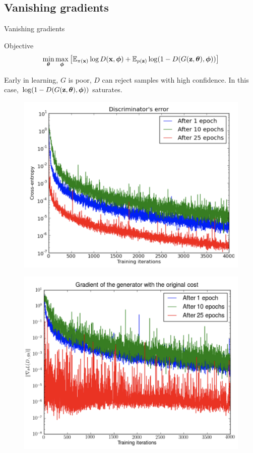 \subsection{Vanishing gradients}
\begin{frame}{Vanishing gradients}
	\vspace{-0.2cm}
	\begin{block}{Objective}
		\vspace{-0.8cm}
		\[
		\min_{\boldsymbol{\theta}} \max_{\boldsymbol{\phi}} \left[ \mathbb{E}_{\pi(\mathbf{x})} \log D(\mathbf{x}, \boldsymbol{\phi}) + \mathbb{E}_{p(\mathbf{z})} \log (1 - D(G(\mathbf{z}, \boldsymbol{\theta}), \boldsymbol{\phi})) \right]
		\]
		\vspace{-0.6cm}
	\end{block}
	Early in learning, $G$ is poor, $D$ can reject samples with high confidence. In this case, $\log (1 - D(G(\mathbf{z}, \boldsymbol{\theta}), \boldsymbol{\phi}))$ saturates.
	\begin{minipage}[t]{0.5\columnwidth}
		\begin{figure}
			\centering
			\includegraphics[width=0.9\linewidth]{figs/vanishing_gradients_1}
		\end{figure}
	\end{minipage}%
	\begin{minipage}[t]{0.5\columnwidth}
		\begin{figure}
			\centering
			\includegraphics[width=0.9\linewidth]{figs/vanishing_gradients_2}

\end{figure}
\end{minipage}
\end{frame}
